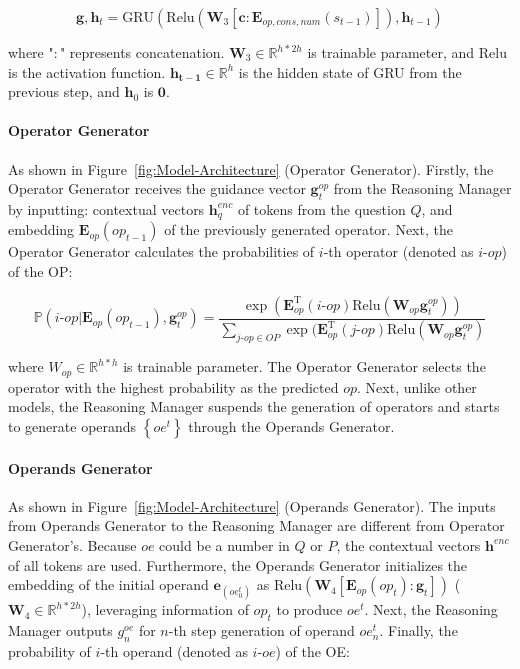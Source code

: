 \documentclass{article}
\begin{document}
\begin{equation}
\mathbf{g}, \mathbf{h}_{t} = \text{GRU} ( \text{Relu}(\mathbf{W}_{3}[\mathbf{c} : \mathbf{E}_{\textit{op},\textit{cons},\textit{num}}(s_{t-1})] ), \mathbf{h}_{t-1})
\end{equation}

where "\(:\)" represents concatenation. \(\mathbf{W}_{3} \in \mathbb{R}^{h*2h}\) is trainable parameter, and \(\text{Relu}\) is the activation function. \(\mathbf{h_{t-1}} \in \mathbb{R}^{h}\) is the hidden state of GRU from the previous step, and \(\mathbf{h}_{0}\) is \(\mathbf{0}\).



\paragraph{Operator Generator}

As shown in Figure~\ref{fig:Model-Architecture} (Operator Generator). Firstly, the Operator Generator receives the guidance vector \(\mathbf{g}^{op}_{t}\) from the Reasoning Manager by inputting: contextual vectors \(\mathbf{h}^{\textit{enc}}_{q}\) of tokens from the question \(Q\), and embedding \(\mathbf{E}_{op}(op_{t-1})\) of the previously generated operator. Next, the Operator Generator calculates the probabilities of \(i\)-th operator (denoted as \(i\)-\(op\)) of the OP:

\begin{equation}\label{eq:opout}
	\mathbb{P} (i\text{-}op | \mathbf{E}_{op}(op_{t-1}), \mathbf{g}^{op}_{t})  
    	= \frac {\exp (\mathbf{E}^\mathrm{T}_{op}(i\text{-}op)  \text{Relu} (\mathbf{W}_{op} \mathbf{g}^{op}_{t}) ) } 
        		{\sum_{j\text{-}op \in \textit{OP}} \exp (\mathbf{E}^\mathrm{T}_{op}(j\text{-}op) \text{Relu} (\mathbf{W}_{op} \mathbf{g}^{op}_{t} ) }
\end{equation}

where \(W_{op} \in \mathbb{R}^{h*h}\) is trainable parameter. The Operator Generator selects the operator with the highest probability as the predicted \(op\). Next, unlike other models, the Reasoning Manager suspends the generation of operators and starts to generate operands \(\left\{ oe^{t} \right\}\) through the Operands Generator.

\paragraph{Operands Generator}

As shown in Figure~\ref{fig:Model-Architecture} (Operands Generator). The inputs from Operands Generator to the Reasoning Manager are different from Operator Generator's. Because \(oe\) could be a number in \(Q\) or \(P\), the contextual vectors \(\mathbf{h}^{\textit{enc}}\) of all tokens are used. Furthermore, the Operands Generator initializes the embedding of the initial operand \(\mathbf{e}_{(oe^{t}_{0})}\) as \(\text{Relu}( \mathbf{W}_{4} [\mathbf{E}_{op}(op_{t}) : \mathbf{g}_{t}])\) (\(\mathbf{W}_{4} \in \mathbb{R}^{h*2h}\)), leveraging information of \(op_{t}\) to produce \(oe^{t}\). Next, the Reasoning Manager outputs \(g^{oe}_{n}\) for \(n\)-th step generation of operand \(oe^{t}_{n}\). Finally, the probability of \(i\)-th operand (denoted as \(i\)-\(oe\)) of the OE:
\end{document}
